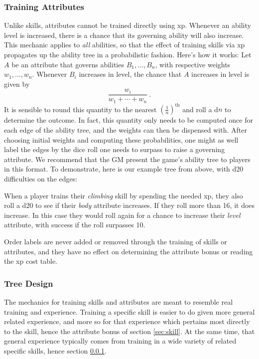 \documentclass[12pt]{article}
\begin{document}
\subsubsection{Training Attributes}\label{sec:att}
Unlike skills, attributes cannot be trained directly using xp.
Whenever an ability level is increased, there is a chance that its governing ability will also increase.
This mechanic applies to \emph{all} abilities, so that the effect of training skills via xp
propagates up the ability tree in a probabilistic fashion.
Here's how it works:
Let $A$ be an attribute that governs abilities $B_1,\ldots,B_n$, with respective weights $w_1,\ldots, w_n$.
Whenever $B_i$ increases in level, the chance that $A$ increases in level is given by
$$\frac{w_i}{w_1+\cdots+w_n}\ .$$
It is sensible to round this quantity to the nearest $(\frac{1}{n})^\text{th}$ and roll a d$n$ to determine
the outcome.
In fact, this quantity only needs to be computed once for each edge of the ability tree,
and the weights can then be dispensed with.
After choosing initial weights and computing these probabilities,
one might as well label the edges by the dice roll one needs to surpass to raise a governing attribute.
We recommend that the GM present the game's ability tree to players in this format.
To demonstrate, here is our example tree from above, with d20 difficulties on the edges:
\begin{center}

\end{center}
When a player trains their \emph{climbing} skill by spending the needed xp,
they also roll a d20 to see if their \emph{body} attribute increases.
If they roll more than 16, it does increase.
In this case they would roll again for a chance to increase their \emph{level} attribute,
with success if the roll surpasses 10.


Order labels are never added or removed through the training of skills or attributes,
and they have no effect on determining the attribute bonus or reading the xp cost table.





\subsubsection{Tree Design}
The mechanics for training skills and attributes are meant to resemble real training and experience.
Training a specific skill is easier to do given more general related experience,
and more so for that experience which pertains most directly to the skill,
hence the attribute bonus of section \ref{sec:skill}.
At the same time, that general experience typically comes from training in a wide variety of related specific skills,
hence section \ref{sec:att}.
\end{document}
